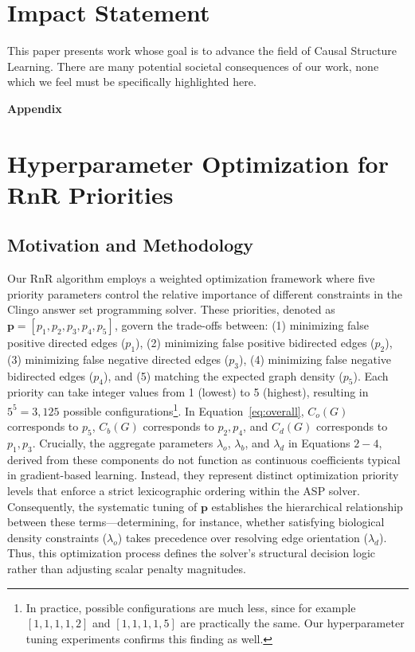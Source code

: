 \section*{Impact Statement}

This paper presents work whose goal is to advance the field of Causal Structure
Learning. There are many potential societal consequences of our work, none
which we feel must be specifically highlighted here.







\newpage
 \onecolumn

\begin{center}
{\LARGE \textbf{Appendix}}
\end{center}
\appendix



\section{Hyperparameter Optimization for RnR Priorities}
\label{sec:hyperparameter_optimization}

\subsection{Motivation and Methodology}

Our RnR algorithm employs a weighted optimization framework where five priority parameters control the relative importance of different constraints in the Clingo answer set programming solver. These priorities, denoted as $\mathbf{p} = [p_1, p_2, p_3, p_4, p_5]$, govern the trade-offs between: (1) minimizing false positive directed edges ($p_1$), (2) minimizing false positive bidirected edges ($p_2$), (3) minimizing false negative directed edges ($p_3$), (4) minimizing false negative bidirected edges ($p_4$), and (5) matching the expected graph density ($p_5$). Each priority can take integer values from 1 (lowest) to 5 (highest), resulting in $5^5 = 3{,}125$ possible configurations\footnote{In practice, possible configurations are much less, since for example $[1,1,1,1,2]$ and $[1,1,1,1,5]$ are practically the same. Our hyperparameter tuning experiments confirms this finding as well.}. In Equation~\ref{eq:overall}, $C_{o}(G)$ corresponds to $p_5$, $C_{b}(G)$ corresponds to $p_2,p_4$, and $C_{d}(G)$ corresponds to $p_1,p_3$. Crucially, the aggregate parameters $\lambda_{o}$, $\lambda_{b}$, and $\lambda_{d}$ in Equations $2-4$, derived from these components do not function as continuous coefficients typical in gradient-based learning. Instead, they represent distinct optimization priority levels that enforce a strict lexicographic ordering within the ASP solver. Consequently, the systematic tuning of $\mathbf{p}$ establishes the hierarchical relationship between these terms---determining, for instance, whether satisfying biological density constraints ($\lambda_{o}$) takes precedence over resolving edge orientation ($\lambda_{d}$). Thus, this optimization process defines the solver's structural decision logic rather than adjusting scalar penalty magnitudes.

